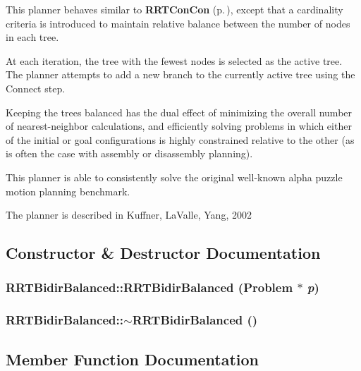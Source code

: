 This planner behaves similar to {\bf RRTCon\-Con} {\rm (p.\,\pageref{classRRTConCon})}, except that a cardinality criteria is introduced to maintain relative balance between the number of nodes in each tree.

At each iteration, the tree with the fewest nodes is selected as the active tree. The planner attempts to add a new branch to the currently active tree using the Connect step.

Keeping the trees balanced has the dual effect of minimizing the overall number of nearest-neighbor calculations, and efficiently solving problems in which either of the initial or goal configurations is highly constrained relative to the other (as is often the case with assembly or disassembly planning).

This planner is able to consistently solve the original well-known alpha puzzle motion planning benchmark.

The planner is described in Kuffner, La\-Valle, Yang, 2002 



\subsection{Constructor \& Destructor Documentation}
\subsubsection{\setlength{\rightskip}{0pt plus 5cm}RRTBidir\-Balanced::RRTBidir\-Balanced ({\bf Problem} $\ast$ {\em p})}\label{classRRTBidirBalanced_a0}


\subsubsection{\setlength{\rightskip}{0pt plus 5cm}RRTBidir\-Balanced::$\sim$RRTBidir\-Balanced ()\hspace{0.3cm}{\tt  [inline, virtual]}}\label{classRRTBidirBalanced_a1}




\subsection{Member Function Documentation}
